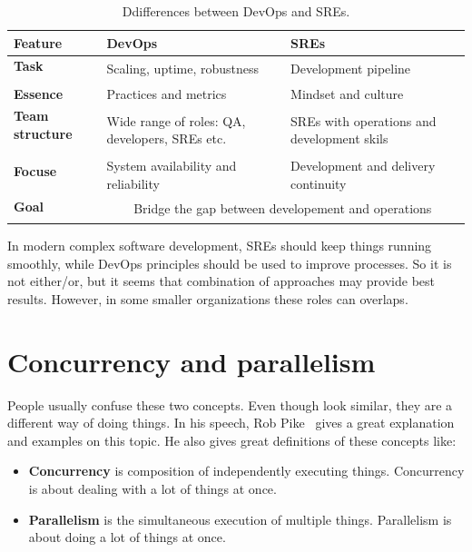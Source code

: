 {\begin{table}[H]
	\begin{center}
		\begin{tabular}{l|l|l}
			\textbf{Feature} & \textbf{DevOps} & \textbf{SREs}\\
			\hline
			\textbf{Task} & \multirow{2}{10em}{Scaling, uptime, robustness} & \multirow{2}{10em}{Development pipeline} \\
			& & \\
			\textbf{Essence} & Practices and metrics &  Mindset and culture \\
			\textbf{Team structure} & \multirow{3}{10em}{Wide range of roles: QA, developers, SREs etc.} &  \multirow{3}{10em}{SREs with operations and development skils} \\
			&  &  \\
			&  &  \\
			\textbf{Focuse} & \multirow{2}{10em}{System availability and reliability} & \multirow{2}{10em}{Development and delivery continuity} \\
			 &  &  \\
			 \hline
			\textbf{Goal} & \multicolumn{2}{c}{\multirow{2}{15em}{Bridge the gap between developement and operations}} \\
			&  &  \\
		\end{tabular}
	\end{center}
	\vspace{-0.5cm}
	\caption{Ddifferences between DevOps and SREs.}
	\label{tab:table10}
\end{table}

\noindent
In modern complex software development, SREs should keep things running smoothly, while DevOps principles should be used to improve processes. So it is not either/or, but it seems that combination of approaches may provide best results. However, in some smaller organizations these roles can overlaps.
}
%
%
\section{Concurrency and parallelism}\label{sec:concurency_parallelism}
%
People usually confuse these two concepts. Even though look similar, they are a different way of doing things. In his speech, Rob Pike~\cite{Pike} gives a great explanation and examples on this topic. He also gives great definitions of these concepts like:

\begin{itemize}
	\item \textbf{Concurrency} is composition of independently executing things. Concurrency is about dealing with a lot of things at once.
	\item \textbf{Parallelism} is the simultaneous execution of multiple things. Parallelism is about doing a lot of things at once. 
\end{itemize}

